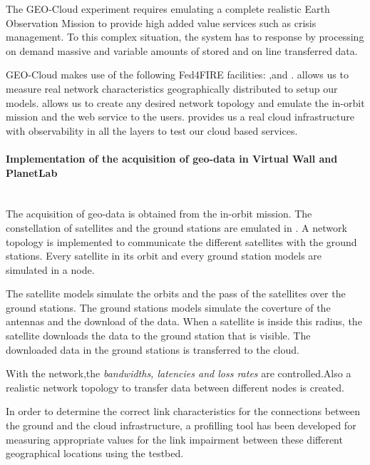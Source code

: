 The GEO-Cloud experiment requires emulating a complete realistic Earth Observation Mission to provide high added value services such as crisis management. To this complex situation, the system has to response by processing on demand massive and variable amounts of stored and on line transferred data.

GEO-Cloud makes use of the following Fed4FIRE facilities: \pl,\vw and
\bonfire. \pl allows us to measure real network characteristics geographically
distributed to setup our models. \vw allows us to create any desired network
topology and emulate the in-orbit mission and the web service to the
users. \bonfire provides us a real cloud infrastructure with observability in
all the layers to test our cloud based services.


\paragraph{Implementation of the acquisition of geo-data in Virtual Wall and
  PlanetLab}~\\
The acquisition of geo-data is obtained from the in-orbit mission. The
constellation of satellites and the ground stations are emulated in \vw. A
network topology is implemented to communicate the different satellites with the ground stations. Every satellite in its orbit and every ground station models are simulated in a node.

The satellite models simulate the orbits and the pass of the satellites over the ground stations. The ground stations models simulate the coverture of the antennas and the download of the data. When a satellite is inside this radius, the satellite downloads the data to the ground station that is visible. The downloaded data in the ground stations is transferred to the \bonfire cloud.

With the \vw network,the \emph{bandwidths, latencies and loss rates} are
controlled.Also a realistic network topology to transfer data between different
nodes is created.

In order to determine the correct link characteristics for the connections
between the ground and the cloud infrastructure, a profilling tool has been
developed for measuring appropriate values for the link impairment between these different geographical locations using the \pl testbed.


